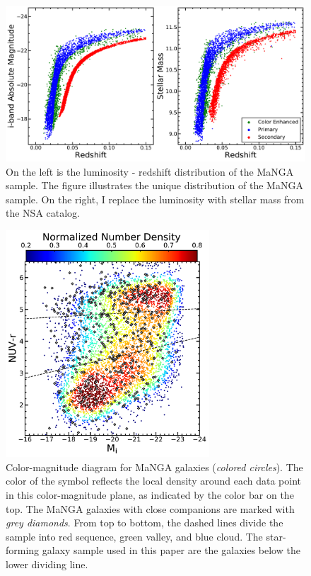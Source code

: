\documentclass[iop,revtex4,twocolumn,apj,numberedappendix,appendixfloats]{emulateapj}
\begin{document}
\begin{figure}
\centering
\includegraphics[width=\linewidth]{fig/Mi-z.pdf}
\caption[The luminosity - redshift distribution and mass - redshift distribution of the MaNGA sample.]{On the left is the luminosity - redshift distribution of the MaNGA sample. The figure illustrates the unique distribution of the MaNGA sample. On the right, I replace the luminosity with stellar mass from the NSA catalog.}
\label{fig:Mi-z}
\end{figure}

\begin{figure}
\centering
\includegraphics[width=3in]{fig/color-mag.pdf}
\caption[Color-magnitude distribution of the MaNGA galaxies]{Color-magnitude diagram for MaNGA galaxies ({\it colored circles}). The color of the symbol reflects the local density around each data point in this color-magnitude plane, as indicated by the color bar on the top. The MaNGA galaxies with close companions are marked with {\it grey diamonds}. From top to bottom, the dashed lines divide the sample into red sequence, green valley, and blue cloud. The star-forming galaxy sample used in this paper are the galaxies below the lower dividing line.}
\label{fig:cmd}
\end{figure}
\end{document}
